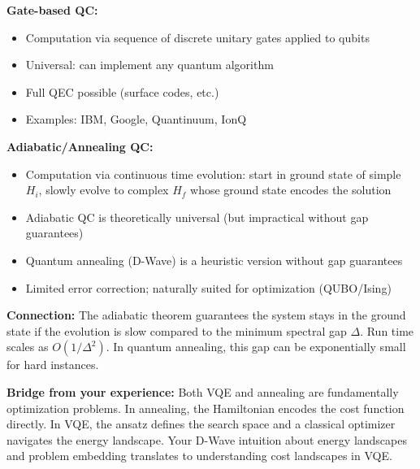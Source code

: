 \documentclass[11pt,a4paper]{article}
\begin{document}
\begin{answerbox}
\textbf{Gate-based QC:}
\begin{itemize}
    \item Computation via sequence of discrete unitary gates applied to qubits
    \item Universal: can implement any quantum algorithm
    \item Full QEC possible (surface codes, etc.)
    \item Examples: IBM, Google, Quantinuum, IonQ
\end{itemize}

\textbf{Adiabatic/Annealing QC:}
\begin{itemize}
    \item Computation via continuous time evolution: start in ground state of simple $H_i$, slowly evolve to complex $H_f$ whose ground state encodes the solution
    \item Adiabatic QC is theoretically universal (but impractical without gap guarantees)
    \item Quantum annealing (D-Wave) is a heuristic version without gap guarantees
    \item Limited error correction; naturally suited for optimization (QUBO/Ising)
\end{itemize}

\textbf{Connection:} The adiabatic theorem guarantees the system stays in the ground state if the evolution is slow compared to the minimum spectral gap $\Delta$. Run time scales as $O(1/\Delta^2)$. In quantum annealing, this gap can be exponentially small for hard instances.

\textbf{Bridge from your experience:} Both VQE and annealing are fundamentally optimization problems. In annealing, the Hamiltonian encodes the cost function directly. In VQE, the ansatz defines the search space and a classical optimizer navigates the energy landscape. Your D-Wave intuition about energy landscapes and problem embedding translates to understanding cost landscapes in VQE.
\end{answerbox}
\end{document}
